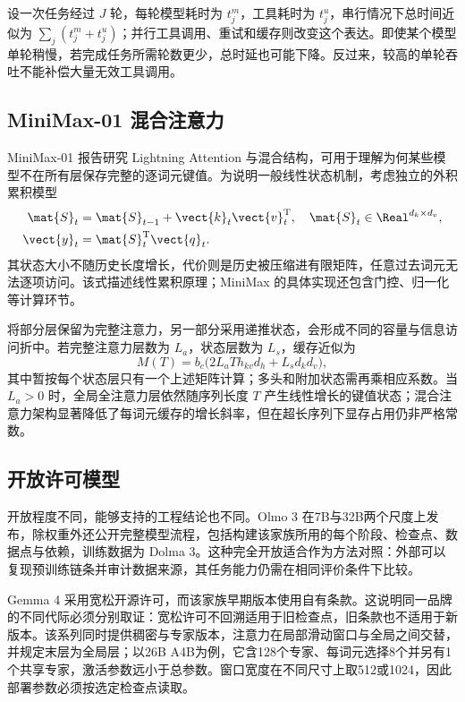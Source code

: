 \documentclass[../textbook.tex]{subfiles}
\begin{document}
设一次任务经过 $J$ 轮，每轮模型耗时为 $t_j^m$，工具耗时为 $t_j^u$，串行情况下总时间近似为 $\sum_j(t_j^m+t_j^u)$；并行工具调用、重试和缓存则改变这个表达。即使某个模型单轮稍慢，若完成任务所需轮数更少，总时延也可能下降。反过来，较高的单轮吞吐不能补偿大量无效工具调用。

\subsection{MiniMax-01 混合注意力}
MiniMax-01 报告研究 Lightning Attention 与混合结构\cite{minimax2025one}，可用于理解为何某些模型不在所有层保存完整的逐词元键值。为说明一般线性状态机制，考虑独立的外积累积模型
\begin{equation}
 \begin{aligned}
  \mat{S}_t &= \mat{S}_{t-1}+\vect{k}_t\vect{v}_t^{\mathrm{T}}, \quad \mat{S}_t\in\Real^{d_k\times d_v}, \\
  \vect{y}_t &= \mat{S}_t^{\mathrm{T}}\vect{q}_t.
 \end{aligned}
\end{equation}
其状态大小不随历史长度增长，代价则是历史被压缩进有限矩阵，任意过去词元无法逐项访问。该式描述线性累积原理；MiniMax 的具体实现还包含门控、归一化等计算环节。

将部分层保留为完整注意力，另一部分采用递推状态，会形成不同的容量与信息访问折中。若完整注意力层数为 $L_a$，状态层数为 $L_s$，缓存近似为
\begin{equation}
 M(T)=b_c\bigl(2L_aT h_{kv}d_h+L_s d_kd_v\bigr),
\end{equation}
其中暂按每个状态层只有一个上述矩阵计算；多头和附加状态需再乘相应系数。当 $L_a>0$ 时，全局全注意力层依然随序列长度 $T$ 产生线性增长的键值状态；混合注意力架构显著降低了每词元缓存的增长斜率，但在超长序列下显存占用仍非严格常数。

\subsection{开放许可模型}
开放程度不同，能够支持的工程结论也不同。Olmo 3 在7B与32B两个尺度上发布，除权重外还公开完整模型流程，包括构建该家族所用的每个阶段、检查点、数据点与依赖，训练数据为 Dolma 3\cite{olmoteam2025olmo3}。这种完全开放适合作为方法对照：外部可以复现预训练链条并审计数据来源，其任务能力仍需在相同评价条件下比较。

Gemma 4 采用宽松开源许可\cite{gemmateam2026gemma4}，而该家族早期版本使用自有条款。这说明同一品牌的不同代际必须分别取证：宽松许可不回溯适用于旧检查点，旧条款也不适用于新版本。该系列同时提供稠密与专家版本，注意力在局部滑动窗口与全局之间交替，并规定末层为全局层；以26B A4B为例，它含128个专家、每词元选择8个并另有1个共享专家，激活参数远小于总参数。窗口宽度在不同尺寸上取512或1024，因此部署参数必须按选定检查点读取。
\end{document}
